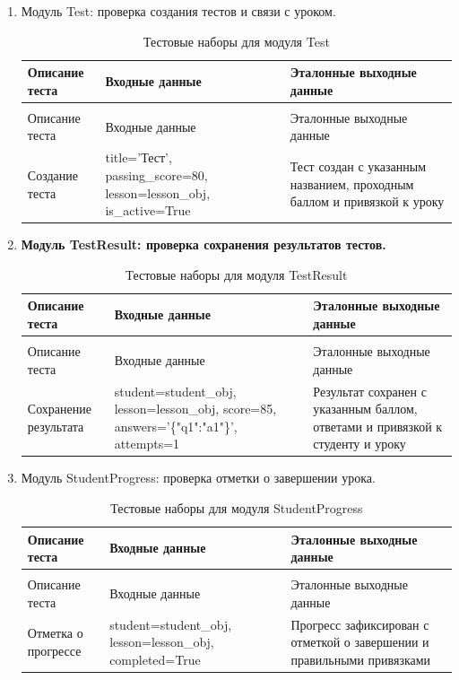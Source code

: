\begin{enumerate}
	\item Модуль Test: проверка создания тестов и связи с уроком.
	\begin{xltabular}{\textwidth}{|p{3cm}|p{6cm}|p{6cm}|}
		\caption{Тестовые наборы для модуля Test\label{tab:test_tests}}\\
		\hline
		Описание теста & Входные данные & Эталонные выходные данные \\ \hline
		\endfirsthead
		\\
		\hline
		Описание теста & Входные данные & Эталонные выходные данные \\ \hline
		\endhead
		Создание теста & title='Тест', passing\_score=80, lesson=lesson\_obj, is\_active=True & Тест создан с указанным названием, проходным баллом и привязкой к уроку \\ \hline
	\end{xltabular}
	
	\item \textbf{Модуль TestResult: проверка сохранения результатов тестов.}
	\begin{xltabular}{\textwidth}{|p{3cm}|p{6cm}|p{6cm}|}
		\caption{Тестовые наборы для модуля TestResult\label{tab:testresult_tests}}\\
		\hline
		Описание теста & Входные данные & Эталонные выходные данные \\ \hline
		\endfirsthead
		\\
		\hline
		Описание теста & Входные данные & Эталонные выходные данные \\ \hline
		\endhead
		Сохранение результата & student=student\_obj, lesson=lesson\_obj, score=85, answers='\{"q1":"a1"\}', attempts=1 & Результат сохранен с указанным баллом, ответами и привязкой к студенту и уроку \\ \hline
	\end{xltabular}
	
	\item Модуль StudentProgress: проверка отметки о завершении урока.
	\begin{xltabular}{\textwidth}{|p{3cm}|p{6cm}|p{6cm}|}
		\caption{Тестовые наборы для модуля StudentProgress\label{tab:studentprogress_tests}}\\
		\hline
		Описание теста & Входные данные & Эталонные выходные данные \\ \hline
		\endfirsthead
		\\
		\hline
		Описание теста & Входные данные & Эталонные выходные данные \\ \hline
		\endhead
		Отметка о прогрессе & student=student\_obj, lesson=lesson\_obj, completed=True & Прогресс зафиксирован с отметкой о завершении и правильными привязками \\ \hline
	\end{xltabular}
	

\end{enumerate}
